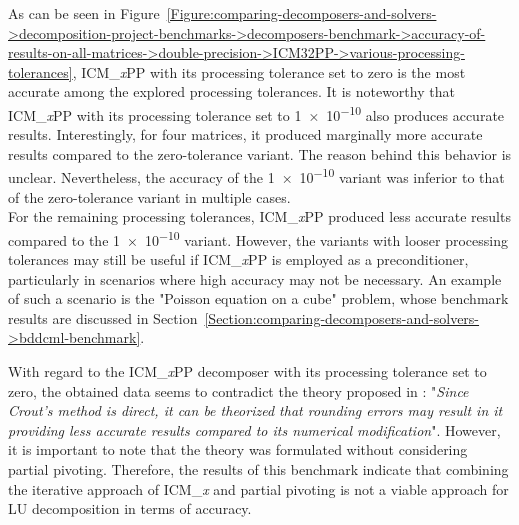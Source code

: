 \label{Text:comparing-decomposers-and-solvers->decomposition-project-benchmarks->decomposers-benchmark->accuracy-of-results-on-all-matrices->double-precision->ICM32PP->various-processing-tolerances->description-of-figure-with-accuracy-results}
As can be seen in Figure~\ref{Figure:comparing-decomposers-and-solvers->decomposition-project-benchmarks->decomposers-benchmark->accuracy-of-results-on-all-matrices->double-precision->ICM32PP->various-processing-tolerances}, ICM\_\textit{x}PP with its processing tolerance set to zero is the most accurate among the explored processing tolerances.
It is noteworthy that ICM\_\textit{x}PP with its processing tolerance set to \num{1e-10} also produces accurate results.
Interestingly, for four matrices, it produced marginally more accurate results compared to the zero-tolerance variant.
The reason behind this behavior is unclear.
Nevertheless, the accuracy of the \num{1e-10} variant was inferior to that of the zero-tolerance variant in multiple cases.\\
For the remaining processing tolerances, ICM\_\textit{x}PP produced less accurate results compared to the \num{1e-10} variant.
However, the variants with looser processing tolerances may still be useful if ICM\_\textit{x}PP is employed as a preconditioner, particularly in scenarios where high accuracy may not be necessary.
An example of such a scenario is the "Poisson equation on a cube" problem, whose benchmark results are discussed in Section~\ref{Section:comparing-decomposers-and-solvers->bddcml-benchmark}.

With regard to the ICM\_\textit{x}PP decomposer with its processing tolerance set to zero, the obtained data seems to contradict the theory proposed in  \cite{Cejka2022}: "\textit{Since Crout’s method is direct, it can be theorized that rounding errors may result in it providing less accurate results compared to its numerical modification}".
However, it is important to note that the theory was formulated without considering partial pivoting.
Therefore, the results of this benchmark indicate that combining the iterative approach of ICM\_\textit{x} and partial pivoting is not a viable approach for LU decomposition in terms of accuracy.

